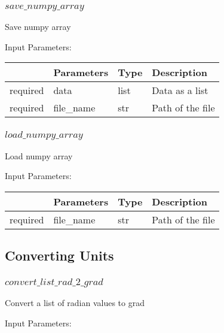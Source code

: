 \documentclass[
	ngerman,
	accentcolor=9c,%
	type=intern,
	marginpar=false
	]{tudapub}
\begin{document}
\subsubsection{$save\_numpy\_array$}
\noindent Save numpy array

\vspace{0.5cm}
\noindent Input Parameters:
\vspace{0.5cm}

\begin{tabular}{|p{}|p{}|p{}| p{}|}
\hline
 & \textbf{Parameters} & \textbf{Type} & \textbf{Description} \\
\hline
required & data & list & Data as a list \\
\hline
required & file\_name & str & Path of the file \\
\hline
\end{tabular}
\vspace{1cm}


\subsubsection{$load\_numpy\_array$}
\noindent Load numpy array

\vspace{0.5cm}
\noindent Input Parameters:
\vspace{0.5cm}

\begin{tabular}{|p{}|p{}|p{}| p{}|}
\hline
 & \textbf{Parameters} & \textbf{Type} & \textbf{Description} \\
\hline
required & file\_name & str & Path of the file \\
\hline
\end{tabular}
\vspace{1cm}


\subsection{Converting Units}
\subsubsection{$convert\_list\_rad\_2\_grad$}
\noindent Convert a list of radian values to grad

\vspace{0.5cm}
\noindent Input Parameters:
\vspace{0.5cm}
\end{document}
